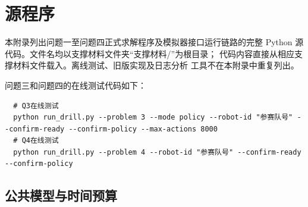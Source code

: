 \section{源程序}

本附录列出问题一至问题四正式求解程序及模拟器接口运行链路的完整
Python 源代码。文件名均以支撑材料文件夹“支撑材料/”为根目录；
代码内容直接从相应支撑材料文件载入。离线测试、旧版实现及日志分析
工具不在本附录中重复列出。

问题三和问题四的在线测试代码如下：
\begin{lstlisting}
  # Q3在线测试
  python run_drill.py --problem 3 --mode policy --robot-id "参赛队号" --confirm-ready --confirm-policy --max-actions 8000
  # Q4在线测试
  python run_drill.py --problem 4 --robot-id "参赛队号" --confirm-ready --confirm-policy
\end{lstlisting}

\begingroup
{}

\subsection{公共模型与时间预算}

\subsubsection*{}


\subsubsection*{}


\subsubsection*{}


